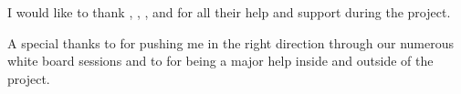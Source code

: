 \vskip 1cm
I would like to thank \FIRSTADVISOR, \SECONDADVISOR, \CHAIRPERSON, and \SECONDMEMBER  for all their help and support during the project.

A special thanks to \FIRSTADVISOR for pushing me in the right direction through our numerous white board sessions and to \SECONDMEMBER for
being a major help inside and outside of the project.

\vskip 2cm
\noindent \AUTHOR \\
\PLACE \\
\DATE
